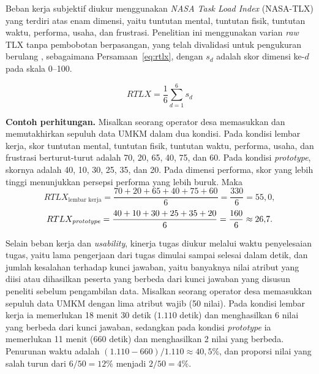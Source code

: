 Beban kerja subjektif diukur menggunakan \textit{NASA Task Load Index} (NASA-TLX) yang terdiri atas enam dimensi, yaitu tuntutan mental, tuntutan fisik, tuntutan waktu, performa, usaha, dan frustrasi. Penelitian ini menggunakan varian \textit{raw} TLX tanpa pembobotan berpasangan, yang telah divalidasi untuk pengukuran berulang \cite{hernandez2022nasatlx}, sebagaimana Persamaan~\eqref{eq:rtlx}, dengan $s_d$ adalah skor dimensi ke-$d$ pada skala 0--100.

\begin{equation}
  RTLX = \frac{1}{6}\sum_{d=1}^{6} s_d
  \label{eq:rtlx}
\end{equation}

\noindent\textbf{Contoh perhitungan.} Misalkan seorang operator desa memasukkan dan memutakhirkan sepuluh data UMKM dalam dua kondisi. Pada kondisi lembar kerja, skor tuntutan mental, tuntutan fisik, tuntutan waktu, performa, usaha, dan frustrasi berturut-turut adalah 70, 20, 65, 40, 75, dan 60. Pada kondisi \textit{prototype}, skornya adalah 40, 10, 30, 25, 35, dan 20. Pada dimensi performa, skor yang lebih tinggi menunjukkan persepsi performa yang lebih buruk. Maka
\[
  RTLX_{\text{lembar kerja}} = \frac{70+20+65+40+75+60}{6} = \frac{330}{6} = 55{,}0,
\]
\[
  RTLX_{\text{\textit{prototype}}} = \frac{40+10+30+25+35+20}{6} = \frac{160}{6} \approx 26{,}7.
\]

Selain beban kerja dan \textit{usability}, kinerja tugas diukur melalui waktu penyelesaian tugas, yaitu lama pengerjaan dari tugas dimulai sampai selesai dalam detik, dan jumlah kesalahan terhadap kunci jawaban, yaitu banyaknya nilai atribut yang diisi atau dihasilkan peserta yang berbeda dari kunci jawaban yang disusun peneliti sebelum pengambilan data. Misalkan seorang operator desa memasukkan sepuluh data UMKM dengan lima atribut wajib (50 nilai). Pada kondisi lembar kerja ia memerlukan 18 menit 30 detik ($1.110$ detik) dan menghasilkan 6 nilai yang berbeda dari kunci jawaban, sedangkan pada kondisi \textit{prototype} ia memerlukan 11 menit ($660$ detik) dan menghasilkan 2 nilai yang berbeda. Penurunan waktu adalah $(1.110 - 660)/1.110 \approx 40{,}5\%$, dan proporsi nilai yang salah turun dari $6/50 = 12\%$ menjadi $2/50 = 4\%$.

